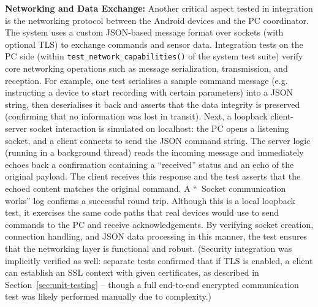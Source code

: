 \textbf{Networking and Data Exchange:} Another critical aspect tested in integration is the networking protocol between the Android devices and the PC coordinator. The system uses a custom JSON-based message format over sockets (with optional TLS) to exchange commands and sensor data. Integration tests on the PC side (within \texttt{test\_network\_capabilities()} of the system test suite) verify core networking operations such as message serialization, transmission, and reception. For example, one test serialises a sample command message (e.g. instructing a device to start recording with certain parameters) into a JSON string, then deserialises it back and asserts that the data integrity is preserved (confirming that no information was lost in transit). Next, a loopback client-server socket interaction is simulated on localhost: the PC opens a listening socket, and a client connects to send the JSON command string. The server logic (running in a background thread) reads the incoming message and immediately echoes back a confirmation containing a ``received'' status and an echo of the original payload. The client receives this response and the test asserts that the echoed content matches the original command. A ``\checkmark\ Socket communication works'' log confirms a successful round trip. Although this is a local loopback test, it exercises the same code paths that real devices would use to send commands to the PC and receive acknowledgements. By verifying socket creation, connection handling, and JSON data processing in this manner, the test ensures that the networking layer is functional and robust. (Security integration was implicitly verified as well: separate tests confirmed that if TLS is enabled, a client can establish an SSL context with given certificates, as described in Section~\ref{sec:unit-testing} -- though a full end-to-end encrypted communication test was likely performed manually due to complexity.)

